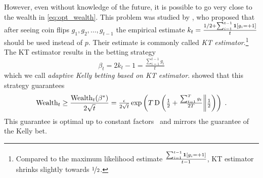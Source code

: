 However, even without knowledge of the future, it is possible to go very close to the wealth in \eqref{eq:opt_wealth}.
This problem was studied by \citet{Krichevsky-Trofimov-1981},
who proposed that after seeing coin flips $g_1, g_2, \dots, g_{t-1}$ the
empirical estimate $k_t = \frac{1/2 + \sum_{i=1}^{t-1} \mathbf{1}[g_i = +1]}{t}$
should be used instead of $p$. Their estimate is commonly called \emph{KT
estimator}.\footnote{Compared to the maximum likelihood estimate
$\frac{\sum_{i=1}^{t-1} \mathbf{1}[g_i = +1]}{t-1}$, KT estimator shrinks
slightly towards $\nicefrac{1}{2}$.} The KT estimator results in the betting strategy
\begin{equation}
\label{equation:kt-estimator-betting-strategy}
\beta_t = 2k_t - 1 = \tfrac{\sum_{i=1}^{t-1} g_i}{t}
\end{equation}
which we call \emph{adaptive Kelly betting based on KT estimator}.
\citeauthor{Krichevsky-Trofimov-1981} showed that this strategy guarantees
\[
\operatorname{Wealth}_t \ge \frac{\operatorname{Wealth}_t(\beta^*)}{2\sqrt{t}}
= \tfrac{\epsilon}{2\sqrt{t}} \exp\left(T \operatorname{D}\left({\tfrac{1}{2}+\tfrac{\sum_{t=1}^T g_t}{2T}}\middle\|{\tfrac{1}{2}}\right)\right)\; .
\]
This guarantee is optimal up to constant factors~\citep{Cesa-Bianchi-Lugosi-2006} and mirrors the guarantee of
the Kelly bet.


